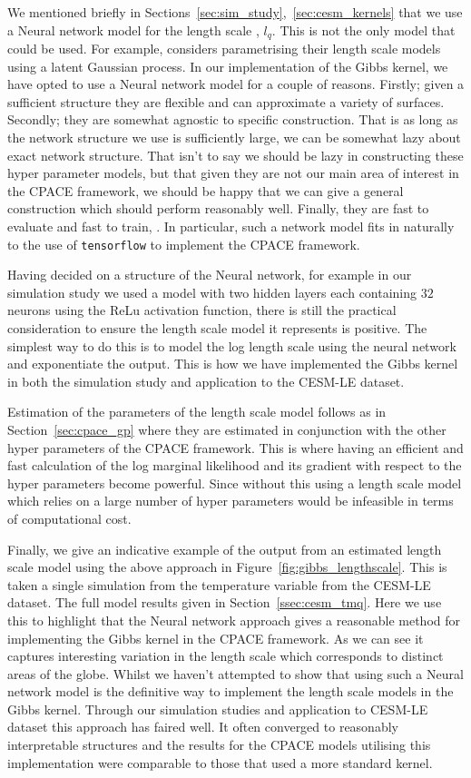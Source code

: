 We mentioned briefly in Sections~\ref{sec:sim_study},~\ref{sec:cesm_kernels} that we use a Neural network model for the length scale , $l_q$.
This is not the only model that could be used.
For example, \citep{paciorek_spatial_2006} considers parametrising their length scale models using a latent Gaussian process.
In our implementation of the Gibbs kernel, we have opted to use a Neural network model for a couple of reasons.
Firstly; given a sufficient structure they are flexible and can approximate a variety of surfaces.
Secondly; they are somewhat agnostic to specific construction.
That is as long as the network structure we use is sufficiently large, we can be somewhat lazy about exact network structure. 
That isn't to say we should be lazy in constructing these hyper parameter models, but that given they are not our main area of interest in the CPACE framework, we should be happy that we can give a general construction which should perform reasonably well.
Finally, they are fast to evaluate and fast to train, \citep{abadi_tensorflow_2016}.
In particular, such a network model fits in naturally to the use of \verb*|tensorflow| to implement the CPACE framework.

Having decided on a structure of the Neural network, for example in our simulation study we used a model with two hidden layers each containing $32$ neurons using the ReLu activation function, there is still the practical consideration to ensure the length scale model it represents is positive.
The simplest way to do this is to model the log length scale using the neural network and exponentiate the output.
This is how we have implemented the Gibbs kernel in both the simulation study and application to the CESM-LE dataset. 

Estimation of the parameters of the length scale model follows as in Section~\ref{sec:cpace_gp} where they are estimated in conjunction with the other hyper parameters of the CPACE framework.
This is where having an efficient and fast calculation of the log marginal likelihood and its gradient with respect to the hyper parameters become powerful.
Since without this using a length scale model which relies on a large number of hyper parameters would be infeasible in terms of computational cost.

Finally, we give an indicative example of the output from an estimated length scale model using the above approach in Figure~\ref{fig:gibbs_lengthscale}.
This is taken a single simulation from the temperature variable from the CESM-LE dataset.
The full model results given in Section~\ref{ssec:cesm_tmq}.
Here we use this to highlight that the Neural network approach gives a reasonable method for implementing the Gibbs kernel in the CPACE framework.
As we can see it captures interesting variation in the length scale which corresponds to distinct areas of the globe.
Whilst we haven't attempted to show that using such a Neural network model is the definitive way to implement the length scale models in the Gibbs kernel.
Through our simulation studies and application to CESM-LE dataset this approach has faired well.
It often converged to reasonably interpretable structures and the results for the CPACE models utilising this implementation were comparable to those that used a more standard kernel.

